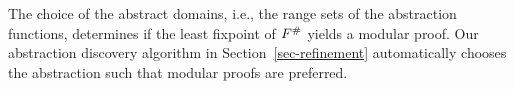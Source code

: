 The choice of the abstract domains, i.e., the range sets of the
abstraction functions, determines if the least fixpoint of ${F^{\#}}$
yields a modular proof.
Our abstraction discovery algorithm in Section~\ref{sec-refinement}
automatically chooses the abstraction such that modular proofs are
preferred.


